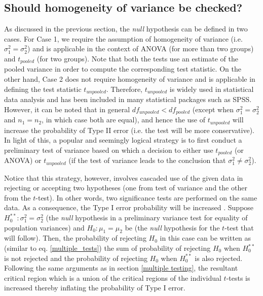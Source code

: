 \documentclass[10pt,final,Twcolumn]{IEEEtran}
\begin{document}
\subsection{Should homogeneity of variance be checked?}

As discussed in the previous section, the {\it{null}} hypothesis can be defined in two cases. For Case 1, we require the assumption of homogeneity of variance (i.e. $\sigma_1^2 = \sigma_2^2$) and is applicable in the context of ANOVA (for more than two groups) and $t_{pooled}$ (for two groups). Note that both the tests use an estimate of the pooled variance in order to compute the corresponding test statistic. On the other hand, Case 2 does not require homogeneity of variance and is applicable in defining the test statistic $t_{unpooled}$. Therefore, $t_{unpooled}$ is widely used in statistical data analysis and has been included in many statistical packages such as SPSS. However, it can be noted that in general $df_{unpooled} < df_{pooled}$ (except when $\sigma_1^2 = \sigma_2^2$ and $n_1 = n_2$, in which case both are equal), and hence the use of $t_{unpooled}$ will increase the probability of Type II error (i.e. the test will be more conservative). In light of this, a popular and seemingly logical strategy is to first conduct a preliminary test of variance based on which a decision to either use $t_{pooled}$ (or ANOVA) or $t_{unpooled}$ (if the test of variance leads to the conclusion that $\sigma_1^2 \neq \sigma_2^2$). 

Notice that this strategy, however, involves cascaded use of the given data in rejecting or accepting two hypotheses (one from test of variance and the other from the $t$-test). In other words, two significance tests are performed on the same data. As a consequence, the Type I error probability will be increased \cite{roussas2003introduction}. Suppose $H_0^{**}:\sigma_1^2 = \sigma_2^2$ (the {\it{null}} hypothesis in a preliminary variance test for equality of population variances) and $H_0:\mu_1 = \mu_2$ be (the {\it{null}} hypothesis for the $t$-test that will follow). Then, the probability of rejecting $H_0$ in this case can be written as (similar to eq. \ref{multiple_tests}) the sum of probability of rejecting $H_0$ when  $H_0^{**}$ is not rejected and the probability of rejecting $H_0$ when  $H_0^{**}$ is also rejected. Following the same arguments as in section \ref{multiple testing}, the resultant critical region which is a union of the critical regions of the individual $t$-tests is increased thereby inflating the probability of Type I error. 
\end{document}
